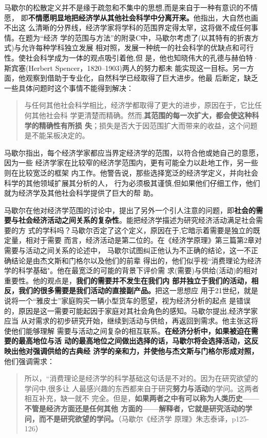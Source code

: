 马歇尔的松散定义并不是缘于疏忽和不集中的思想,而是来自于一种有意识的不情愿，
即\textbf{不情愿明显地把经济学从其他社会科学中分离开来。}他指出，大自然也画不出这
么清晰的分界线，经济学家将学科的范围界定得太罕，这将做不成任何事情。在题为“经济
学的范围与方法”的附录C中，马歇尔考虑了(以其特有的折衷方式)与允许每种学科独立发展
相对照，发展一种统一的社会科学的优缺点和可行性。使社会科学成为一体的观点吸引着他,但
是，他也知晓伟大的孔德与赫伯特·斯宾塞(Herbert Spencer，1820--1903)两人的努力都未
能实现这一目标。另一方面，他观察到借助于专业化，自然科学已经取得了巨大进步。他最
后断定，缺乏一些具体问题时这个事情不能得到解决：
\begin{quotation}
  与任何其他社会科学相比，经济学都取得了更大的进步，原因在于，它比任何其他社会科
  学更清楚而精确。然而,\textbf{其范围的每一次扩大，都会使这种科学的精确性有所损
    失}；损失是否大于因范围扩大而带来的收益，这个问题是不能呆板决定的。
\end{quotation}

马歇尔指出，每个经济学家都应当界定经济学的范围，以符合他或她自己的意愿，因为一些
经济学家在比较窄的经济学范围内，更有可能全力以赴地工作，另一些则在比较宽泛的框架
内工作。他警告说，那些选择宽泛的经济学定义，并向社会科学的其他领域扩展其分析的人，
行为必须极其谨慎,但如果他们仔细工作，他们就为经济学及其他社会科学提供了巨大的帮
助。

马歇尔在他对经济学范围的讨论中，提出了另外一个引人注意的问题，即\textbf{社会的需
  要与社会经济活动之间关系的复杂性}。能把经济学描述为研究经济活动满足社会需要的方
式的学科吗？马歇尔否定了这个定义，原因在于,它暗示着需要是独立的既定量，相对于需要
而言，经济活动是第二位的。在《经济学原理》第三篇第2章对需要与活动之间关系的论述中，
马歇尔试图纠正他认为不正确的结论，这一不正确结论是由杰文斯和门格尔以及他们的前辈
得出的，他们似乎视“消费理论为经济学的科学基础"。他在最宽泛的可能的背景下评价需
求(需要)与供给(活动)的相对重要性。他的观点是，\textbf{我们的需要并不发生在我们内
  部并独立于我们的活动，相反，我们的很多需要是我们活动的直接副产品。}把这一思想应
用于21世纪，就是说将一个“雅皮士”家庭购买一辆小型货车的愿望，视为经济分析的起点
是错误的，原因是这一需要可能起因于家庭对其社会角色的感知。马歇尔提出,经济学家应当
从对需求的初步研究开始，继续到活动与供给，再返回到需求。他主张这将使他们能够理解
需要与活动之间复杂的相互联系。\textbf{在经济分析中，如果被迫在需要的最高地位与活
  动的最高地位之间做出选择的话，马歇尔将会选择活动，这反映出他对强调供给的古典经
  济学的亲和力，并使他与杰文斯与门格尔形成对照，}他们强调需求：
\begin{quotation}
  所以，“消费理论是经济学的科学基础这句话是不对的。因为在研究欲望的学问中,很多让
  人最感兴趣的东西都来自于研究\textbf{努力与活动}的学问。这两者相互补充，缺一就不
  完全。但是，\textbf{如果两者之中有可以称为人类历史——不管是经济方面还是任何其他
    方面的——解释者，它就是研究活动的学问，而不是研究欲望的学问。}（马歇尔《经济学
  原理》朱志泰译，p125-126）
\end{quotation}

